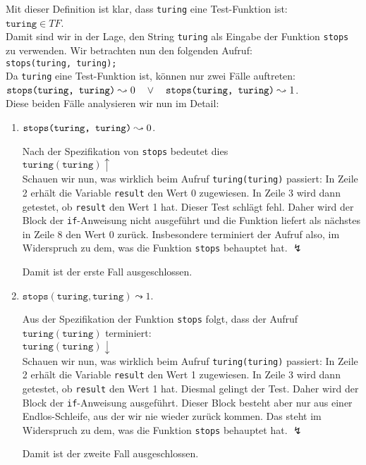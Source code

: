 Mit dieser Definition ist klar, dass \texttt{turing} eine Test-Funktion ist: \\[0.3cm]
\hspace*{1.3cm} $\texttt{turing} \in T\!F$. \\[0.3cm]
Damit sind wir in der Lage, den String \texttt{turing} als Eingabe der Funktion \texttt{stops}
zu verwenden.  Wir betrachten nun den folgenden Aufruf: \\[0.3cm]
\hspace*{1.3cm} \texttt{stops(\texttt{turing}, \texttt{turing});} \\[0.3cm]
Da \texttt{turing} eine Test-Funktion ist, k\"{o}nnen nur zwei F\"{a}lle auftreten:
\\[0.1cm]
\hspace*{1.3cm} 
$\texttt{stops(\texttt{turing}, \texttt{turing})} \leadsto 0 \quad \vee\quad
 \texttt{stops(\texttt{turing}, \texttt{turing})} \leadsto 1$. \\[0.1cm]
Diese beiden F\"{a}lle analysieren wir nun im Detail:
\begin{enumerate}
\item $\texttt{stops(\texttt{turing}, \texttt{turing})} \leadsto 0$. 

      Nach der Spezifikation von \texttt{stops} bedeutet dies \\[0.1cm]
      \hspace*{1.3cm} $\texttt{turing}(\texttt{turing}) \uparrow$ \\[0.1cm]
      Schauen wir nun, was wirklich beim Aufruf \texttt{turing(\texttt{turing})} passiert:
      In Zeile 2 erh\"{a}lt die Variable \texttt{result} den Wert 0 zugewiesen.  In Zeile 3
      wird dann getestet, ob \texttt{result} den Wert 1 hat.  Dieser Test schl\"{a}gt fehl.
      Daher wird der Block der \texttt{if}-Anweisung nicht ausgef\"{u}hrt und die Funktion liefert als
      n\"{a}chstes in Zeile 8 den Wert 0 zur\"{u}ck.  Insbesondere terminiert der Aufruf also, im
      Widerspruch zu dem, was die Funktion \texttt{stops} behauptet hat. $\lightning$

      Damit ist der erste Fall ausgeschlossen.
\item  $\mathtt{stops}(\texttt{turing}, \texttt{turing}) \leadsto 1$. 

      Aus der Spezifikation der Funktion \texttt{stops} folgt, dass der Aufruf
      $\texttt{turing}(\texttt{turing})$ terminiert: \\[0.1cm]
      \hspace*{1.3cm} $\mathtt{turing}(\texttt{turing}) \downarrow$ \\[0.1cm]
      Schauen wir nun, was wirklich beim Aufruf \texttt{turing(\texttt{turing})} passiert:
      In Zeile 2 erh\"{a}lt die Variable \texttt{result} den Wert 1 zugewiesen.  In Zeile 3
      wird dann getestet, ob \texttt{result} den Wert 1 hat.  Diesmal gelingt der Test.
      Daher wird der Block der \texttt{if}-Anweisung ausgef\"{u}hrt.  Dieser Block
      besteht aber nur aus einer Endlos-Schleife, aus der wir nie wieder zur\"{u}ck kommen.
      Das steht im Widerspruch zu dem, was die Funktion \texttt{stops} behauptet hat.
      $\lightning$

      Damit ist der zweite Fall ausgeschlossen.
\end{enumerate}
